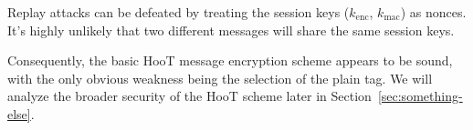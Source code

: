 Replay attacks can be defeated by treating the session keys ($k_{\mathrm{enc}}$, $k_{\mathrm{mac}}$) as nonces. It's highly unlikely that two different messages will share the same session keys.

Consequently, the basic HooT message encryption scheme appears to be sound, with the only obvious weakness being the selection of the plain tag. We will analyze the broader security of the HooT scheme later in Section~\ref{sec:something-else}.
